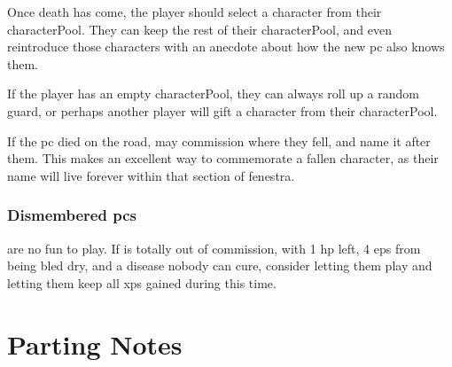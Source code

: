 \begin{multicols}{2}
Once death has come, the player should select a character from their \gls{characterPool}.
They can keep the rest of their \gls{characterPool}, and even reintroduce those characters with an anecdote about how the new \gls{pc} also knows them.

If the player has an empty \gls{characterPool}, they can always roll up a random \gls{guard}, or perhaps another player will gift a character from their \gls{characterPool}.

If the \gls{pc} died on the road,  may commission  where they fell, and name it after them.
This makes an excellent way to commemorate a fallen character, as their name will live forever within that section of \gls{fenestra}.

\subsubsection{Dismembered \Glspl{pc}}
are no fun to play.
If  is totally out of commission, with 1 \gls{hp} left, 4 \glspl{ep} from being bled dry, and a disease nobody can cure, consider letting them play  and letting them keep all \glspl{xp} gained during this time.

\end{multicols}

\section{Parting Notes}

